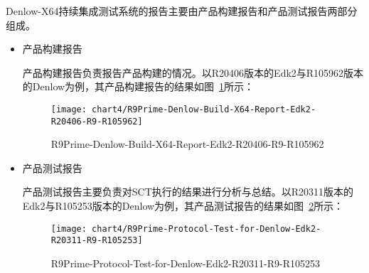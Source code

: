 		Denlow-X64持续集成测试系统的报告主要由产品构建报告和产品测试报告两部分组成。
		
		\begin{itemize}
			\item 产品构建报告
				
				产品构建报告负责报告产品构建的情况。以R20406版本的Edk2与R105962版本的Denlow为例，其产品构建报告的结果如图~\ref{fig:R9Prime-Denlow-Build-X64-Report-Edk2-R20406-R9-R105962}所示：
					
				\begin{figure}[H] %
					\centering
					\texttt{[image: chart4/R9Prime-Denlow-Build-X64-Report-Edk2-R20406-R9-R105962]}
					\caption{R9Prime-Denlow-Build-X64-Report-Edk2-R20406-R9-R105962}
					\label{fig:R9Prime-Denlow-Build-X64-Report-Edk2-R20406-R9-R105962}
				\end{figure}
					
			\item 产品测试报告
				
				产品测试报告主要负责对SCT执行的结果进行分析与总结。以R20311版本的Edk2与R105253版本的Denlow为例，其产品测试报告的结果如图~\ref{fig:R9Prime-Protocol-Test-for-Denlow-Edk2-R20311-R9-R105253}所示：
				
				\begin{figure}[H] %
					\centering
					\texttt{[image: chart4/R9Prime-Protocol-Test-for-Denlow-Edk2-R20311-R9-R105253]}
					\caption{R9Prime-Protocol-Test-for-Denlow-Edk2-R20311-R9-R105253}
					\label{fig:R9Prime-Protocol-Test-for-Denlow-Edk2-R20311-R9-R105253}
				\end{figure}
				
		\end{itemize}
